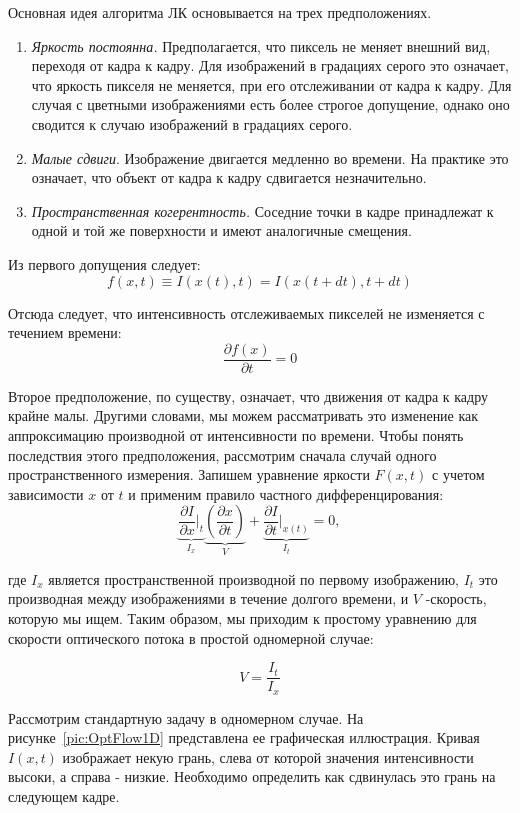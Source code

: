 Основная идея алгоритма ЛК основывается на трех предположениях. 
\begin{enumerate}
\item \textit{Яркость постоянна.} Предполагается, что пиксель не меняет внешний вид, переходя от кадра к кадру. Для изображений в градациях серого это означает, что яркость пикселя не меняется, при его отслеживании от кадра к кадру. Для случая с цветными изображениями есть более строгое допущение, однако оно сводится к случаю изображений в градациях серого. 
\item \textit{Малые сдвиги}. Изображение двигается медленно во времени. На практике это означает, что объект от кадра к кадру сдвигается незначительно.
\item \textit{Пространственная когерентность.} Соседние точки в кадре принадлежат к одной и той же поверхности и имеют аналогичные смещения.
\end{enumerate}

Из первого допущения следует:
$$
f(x, t) \equiv I(x(t), t) = I(x(t+dt), t + dt)
$$

Отсюда следует, что интенсивность отслеживаемых пикселей не изменяется с течением времени:
$$
\frac{\partial f(x)}{\partial t} = 0
$$

Второе предположение, по существу, означает, что движения от кадра к кадру крайне малы. Другими словами, мы можем рассматривать это изменение как аппроксимацию производной от интенсивности по времени. Чтобы понять последствия этого предположения, рассмотрим сначала случай одного пространственного измерения.
Запишем уравнение яркости $F(x,t)$ с учетом зависимости $x$ от $t$ и применим правило частного дифференцирования:
$$
\underbrace{\frac{\partial I }{\partial x} \Bigr|_t}_{I_x} 
\underbrace{\left( \frac{\partial x }{\partial t} \right)}_{V} + 
\underbrace{\frac{\partial I }{\partial t} \Bigr|_{x(t)}}_{I_t} =
 0,
$$

где $I_x$ является пространственной производной по первому изображению, $I_t$ это производная между изображениями в течение долгого времени, и $V$ -скорость, которую мы ищем. Таким образом, мы приходим к простому уравнению для скорости оптического потока в простой одномерной случае:

$$ V = \frac{I_t}{I_x} $$

Рассмотрим стандартную задачу в одномерном случае. На рисунке~\ref{pic:OptFlow1D} представлена ее графическая иллюстрация. Кривая $I(x, t)$ изображает некую грань, слева от которой значения интенсивности высоки, а справа - низкие. Необходимо определить как сдвинулась это грань на следующем кадре. 

